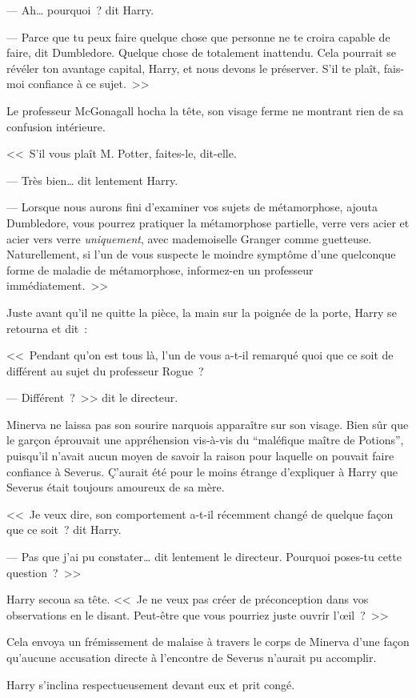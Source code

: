 --- Ah… pourquoi~? dit Harry.

--- Parce que tu peux faire quelque chose que personne ne te croira capable de faire, dit Dumbledore. Quelque chose de totalement inattendu. Cela pourrait se révéler ton avantage capital, Harry, et nous devons le préserver. S'il te plaît, fais-moi confiance à ce sujet.~>>

Le professeur McGonagall hocha la tête, son visage ferme ne montrant rien de sa confusion intérieure.

<<~S'il vous plaît M. Potter, faites-le, dit-elle.

--- Très bien… dit lentement Harry.

--- Lorsque nous aurons fini d'examiner vos sujets de métamorphose, ajouta Dumbledore, vous pourrez pratiquer la métamorphose partielle, verre vers acier et acier vers verre \emph{uniquement}, avec mademoiselle Granger comme guetteuse. Naturellement, si l'un de vous suspecte le moindre symptôme d'une quelconque forme de maladie de métamorphose, informez-en un professeur immédiatement.~>>

Juste avant qu'il ne quitte la pièce, la main sur la poignée de la porte, Harry se retourna et dit~:

<<~Pendant qu'on est tous là, l'un de vous a-t-il remarqué quoi que ce soit de différent au sujet du professeur Rogue~?

--- Différent~?~>> dit le directeur.

Minerva ne laissa pas son sourire narquois apparaître sur son visage. Bien sûr que le garçon éprouvait une appréhension vis-à-vis du “maléfique maître de Potions”, puisqu'il n'avait aucun moyen de savoir la raison pour laquelle on pouvait faire confiance à Severus. Ç'aurait été pour le moins étrange d'expliquer à Harry que Severus était toujours amoureux de sa mère.

<<~Je veux dire, son comportement a-t-il récemment changé de quelque façon que ce soit~? dit Harry.

--- Pas que j'ai pu constater… dit lentement le directeur. Pourquoi poses-tu cette question~?~>>

Harry secoua sa tête. <<~Je ne veux pas créer de préconception dans vos observations en le disant. Peut-être que vous pourriez juste ouvrir l'œil~?~>>

Cela envoya un frémissement de malaise à travers le corps de Minerva d'une façon qu'aucune accusation directe à l'encontre de Severus n'aurait pu accomplir.

Harry s'inclina respectueusement devant eux et prit congé.


